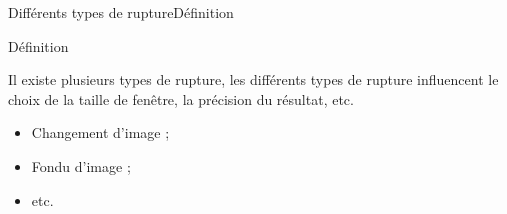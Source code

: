 \begin{frame}{Différents types de rupture}{Définition}
\begin{block}{Définition}

Il existe plusieurs types de rupture, les différents types de rupture influencent le choix de la taille de fenêtre, la précision du résultat, etc. 

\begin{itemize}
    \item Changement d'image ;
    \item Fondu d'image ;
    \item etc.
\end{itemize}

\end{block}

\end{frame}

